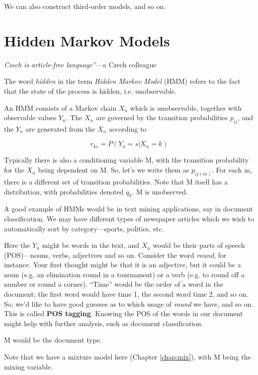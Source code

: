 We can also construct third-order models, and so on.

\section{Hidden Markov Models}
\label{hmm}

{\it Czech is article-free language''}---a Czech colleague

\bigskip

The word {\it hidden} in the term {\it Hidden Markov Model} (HMM)
refers to the fact that the state of the process is hidden, i.e.
unobservable.  

An HMM consists of a Markov chain $X_n$ which is unobservable, together
with observable values $Y_n$.  The $X_n$ are governed by the transition
probabilities $p_{ij}$, and the $Y_n$ are generated from the $X_n$
according to

\begin{equation}
r_{ks} = P(Y_n = s | X_n = k)
\end{equation}

Typically there is also a conditioning variable M, with the transition
probability for the $X_n$ being dependent on M.  So, let's we write them as
$p_{ij(m)}$.  For each m, there is a different set of transition
probabilities.  Note that M itself has a distribution, with
probabilities denoted $q_k$.  M is unobserved.

A good example of HMMs would be in text mining applications, say in
document classification.  We may have different types of newspaper
articles which we wish to automatically sort by category---sports,
politics, etc.  

Here the $Y_n$ might be words in the text, and $X_n$ would be their
parts of speech (POS)---nouns, verbs, adjectives and so on.  Consider
the word {\it round}, for instance.  Your first thought might be that it
is an adjective, but it could be a noun (e.g. an elimination round in a
tournament) or a verb (e.g. to round off a number or round a corner).
``Time'' would be the order of a word in the document; the first word
would have time 1, the second word time 2, and so on.  So, we'd like to
have good guesses as to which usage of {\it round} we have, and so on.
This is called {\bf POS tagging}.  Knowing the POS of the words in our
document might help with further analysis, such as document
classification.

M would be the document type.

Note that we have a mixture model here (Chapter \ref{chap:mix}), with M
being the mixing variable.

